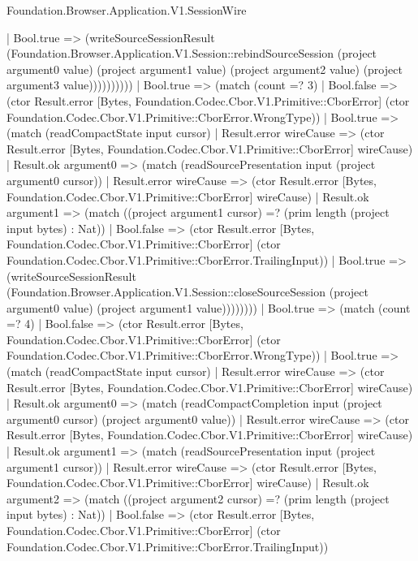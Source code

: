 \begin{lexlean}{Foundation.Browser.Application.V1.SessionWire}
\begin{semanticmodule}
{                              | Bool.true => (writeSourceSessionResult (Foundation.Browser.Application.V1.Session::rebindSourceSession (project argument0 value) (project argument1 value) (project argument2 value) (project argument3 value))))))))))
                | Bool.true => (match (count =? 3)
                  | Bool.false => (ctor Result.error [Bytes, Foundation.Codec.Cbor.V1.Primitive::CborError] (ctor Foundation.Codec.Cbor.V1.Primitive::CborError.WrongType))
                  | Bool.true => (match (readCompactState input cursor)
                    | Result.error wireCause => (ctor Result.error [Bytes, Foundation.Codec.Cbor.V1.Primitive::CborError] wireCause)
                    | Result.ok argument0 => (match (readSourcePresentation input (project argument0 cursor))
                      | Result.error wireCause => (ctor Result.error [Bytes, Foundation.Codec.Cbor.V1.Primitive::CborError] wireCause)
                      | Result.ok argument1 => (match ((project argument1 cursor) =? (prim length (project input bytes) : Nat))
                        | Bool.false => (ctor Result.error [Bytes, Foundation.Codec.Cbor.V1.Primitive::CborError] (ctor Foundation.Codec.Cbor.V1.Primitive::CborError.TrailingInput))
                        | Bool.true => (writeSourceSessionResult (Foundation.Browser.Application.V1.Session::closeSourceSession (project argument0 value) (project argument1 value))))))))
              | Bool.true => (match (count =? 4)
                | Bool.false => (ctor Result.error [Bytes, Foundation.Codec.Cbor.V1.Primitive::CborError] (ctor Foundation.Codec.Cbor.V1.Primitive::CborError.WrongType))
                | Bool.true => (match (readCompactState input cursor)
                  | Result.error wireCause => (ctor Result.error [Bytes, Foundation.Codec.Cbor.V1.Primitive::CborError] wireCause)
                  | Result.ok argument0 => (match (readCompactCompletion input (project argument0 cursor) (project argument0 value))
                    | Result.error wireCause => (ctor Result.error [Bytes, Foundation.Codec.Cbor.V1.Primitive::CborError] wireCause)
                    | Result.ok argument1 => (match (readSourcePresentation input (project argument1 cursor))
                      | Result.error wireCause => (ctor Result.error [Bytes, Foundation.Codec.Cbor.V1.Primitive::CborError] wireCause)
                      | Result.ok argument2 => (match ((project argument2 cursor) =? (prim length (project input bytes) : Nat))
                        | Bool.false => (ctor Result.error [Bytes, Foundation.Codec.Cbor.V1.Primitive::CborError] (ctor Foundation.Codec.Cbor.V1.Primitive::CborError.TrailingInput))
}
\end{semanticmodule}
\end{lexlean}
